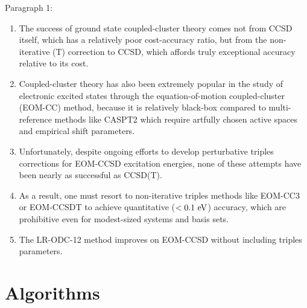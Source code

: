 Paragraph 1:
\begin{enumerate}
    \item
        The success of ground state coupled-cluster theory comes not from CCSD
        itself, which has a relatively poor cost-accuracy ratio, but from the
        non-iterative (T) correction to CCSD, which affords truly exceptional
        accuracy relative to its cost.\cite{Stanton:1997p130}
    \item
        Coupled-cluster theory has also been extremely popular in the study of
        electronic excited states through the equation-of-motion coupled-cluster
        (EOM-CC) method,\cite{Krylov:2008p433} because it is relatively
        black-box compared to multi-reference methods like
        CASPT2\cite{Andersson:1992p1218} which require artfully chosen active
        spaces and empirical shift parameters.\cite{Zobel:2017p1482}
    \item
        Unfortunately, despite ongoing efforts to develop perturbative triples
        corrections for EOM-CCSD excitation energies, none of these attempts
        have been nearly as successful as CCSD(T).\cite{Matthews:2016p124102}
    \item
        As a result, one must resort to non-iterative triples methods like
        EOM-CC3\cite{Koch:1998p1808} or EOM-CCSDT\cite{Hirata:2000p255} to
        achieve quantitative (\(<0.1~\mathrm{eV}\)) accuracy, which are prohibitive even
        for modest-sized systems and basis sets.
    \item
        The LR-ODC-12 method improves on EOM-CCSD without including triples
        parameters.
\end{enumerate}


\section{Algorithms}

